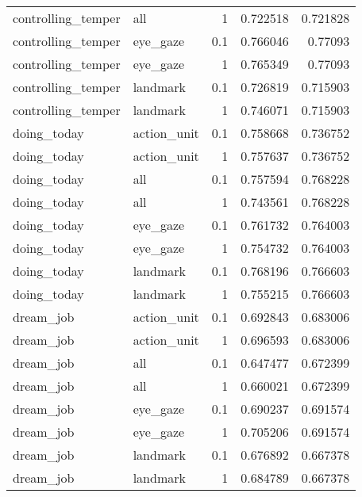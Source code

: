 \begin{tabular}{llrrr}
     controlling\_temper & all         &                     1   & 0.722518 &  0.721828 \\
     controlling\_temper & eye\_gaze    &                     0.1 & 0.766046 &  0.77093  \\
     controlling\_temper & eye\_gaze    &                     1   & 0.765349 &  0.77093  \\
     controlling\_temper & landmark    &                     0.1 & 0.726819 &  0.715903 \\
     controlling\_temper & landmark    &                     1   & 0.746071 &  0.715903 \\
     doing\_today        & action\_unit &                     0.1 & 0.758668 &  0.736752 \\
     doing\_today        & action\_unit &                     1   & 0.757637 &  0.736752 \\
     doing\_today        & all         &                     0.1 & 0.757594 &  0.768228 \\
     doing\_today        & all         &                     1   & 0.743561 &  0.768228 \\
     doing\_today        & eye\_gaze    &                     0.1 & 0.761732 &  0.764003 \\
     doing\_today        & eye\_gaze    &                     1   & 0.754732 &  0.764003 \\
     doing\_today        & landmark    &                     0.1 & 0.768196 &  0.766603 \\
     doing\_today        & landmark    &                     1   & 0.755215 &  0.766603 \\
     dream\_job          & action\_unit &                     0.1 & 0.692843 &  0.683006 \\
     dream\_job          & action\_unit &                     1   & 0.696593 &  0.683006 \\
     dream\_job          & all         &                     0.1 & 0.647477 &  0.672399 \\
     dream\_job          & all         &                     1   & 0.660021 &  0.672399 \\
     dream\_job          & eye\_gaze    &                     0.1 & 0.690237 &  0.691574 \\
     dream\_job          & eye\_gaze    &                     1   & 0.705206 &  0.691574 \\
     dream\_job          & landmark    &                     0.1 & 0.676892 &  0.667378 \\
     dream\_job          & landmark    &                     1   & 0.684789 &  0.667378 \\
    \hline
    \end{tabular}